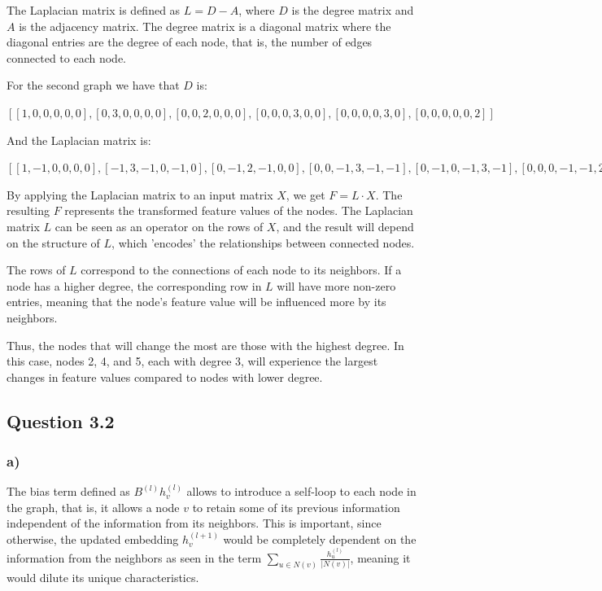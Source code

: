 \documentclass{article}
\begin{document}
The Laplacian matrix is defined as $L = D - A$, where $D$ is the degree matrix and $A$ is the adjacency matrix.
The degree matrix is a diagonal matrix where the diagonal entries are the degree of each node, that is, the number of edges
connected to each node.

For the second graph we have that $D$ is:

$[
[1, 0, 0, 0, 0, 0],
[0, 3, 0, 0, 0, 0],
[0, 0, 2, 0, 0, 0],
[0, 0, 0, 3, 0, 0],
[0, 0, 0, 0, 3, 0],
[0, 0, 0, 0, 0, 2]]$

And the Laplacian matrix is:

$[
[1, -1,  0, 0, 0, 0],
[-1, 3, -1, 0, -1, 0],
[0, -1,  2, -1, 0, 0],
[0, 0,  -1, 3, -1, -1],
[0, -1,  0, -1, 3, -1],
[0, 0,   0, -1, -1, 2]]$

By applying the Laplacian matrix to an input matrix $X$, we get $F = L \cdot X$. The resulting $F$ represents the transformed
feature values of the nodes. The Laplacian matrix $L$  can be seen as an operator on the rows of $X$, and the result
will depend on the structure of $L$, which 'encodes' the relationships between connected nodes.

The rows of $L$ correspond to the connections of each node to its neighbors. If a node has a higher degree, the corresponding row in 
$L$ will have more non-zero entries, meaning that the node's feature value will be influenced more by its neighbors.

Thus, the nodes that will change the most are those with the highest degree. In this case, nodes 2, 4, and 5,
each with degree 3, will experience the largest changes in feature values compared to nodes with lower degree.

\subsection*{Question 3.2}

\subsubsection*{a)}

The bias term defined as $B^{(l)}h_v^{(l)}$ allows to introduce a self-loop to each node in the graph, that is, it allows
a node $v$ to retain some of its previous information independent of the information from its neighbors. This is important,
since otherwise, the updated embedding $h_v^{(l+1)}$ would be completely dependent on the information from the neighbors
as seen in the term $\sum_{u \in N(v)} \frac{h_u^{(l)}}{|N(v)|}$, meaning it would dilute its unique characteristics.
\end{document}
